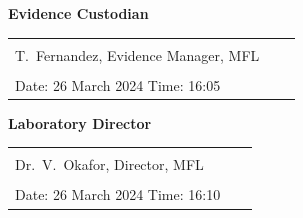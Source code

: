 \documentclass[letterpaper,11pt]{article}
\begin{document}
\vspace{5pt}

\begin{tcolorbox}[sectionbox, title={\faUserShield\quad AUTHORISING SIGNATURES}]
\vspace{3pt}
\sffamily\small
\noindent
\begin{minipage}[t]{0.48\linewidth}
  \textbf{Evidence Custodian}\\[5pt]
  \begin{tabular}{@{}p{0.90\linewidth}@{}}
    \arrayrulecolor{ForensicBlue}\hline\\[-4pt]
    T.\ Fernandez, Evidence Manager, MFL\\[7pt]
    \hline\\[-4pt]
    Date: 26 March 2024 \quad Time: 16:05\\
  \end{tabular}
\end{minipage}%
\hfill
\begin{minipage}[t]{0.48\linewidth}
  \textbf{Laboratory Director}\\[5pt]
  \begin{tabular}{@{}p{0.90\linewidth}@{}}
    \arrayrulecolor{ForensicBlue}\hline\\[-4pt]
    Dr.\ V.\ Okafor, Director, MFL\\[7pt]
    \hline\\[-4pt]
    Date: 26 March 2024 \quad Time: 16:10\\
  \end{tabular}
\end{minipage}

\vspace{5pt}


\end{tcolorbox}
\end{document}
